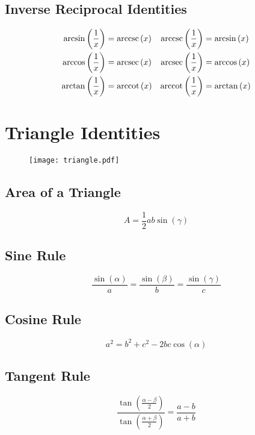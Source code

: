 \documentclass{article}
\begin{document}
\subsection{Inverse Reciprocal Identities}
\begin{align*}
    \arcsin{\left( \frac{1}{x} \right)} &= \arccsc{\left( x \right)} & \arccsc{\left( \frac{1}{x} \right)} &= \arcsin{\left( x \right)} \\
    \arccos{\left( \frac{1}{x} \right)} &= \arcsec{\left( x \right)} & \arcsec{\left( \frac{1}{x} \right)} &= \arccos{\left( x \right)} \\
    \arctan{\left( \frac{1}{x} \right)} &= \arccot{\left( x \right)} & \arccot{\left( \frac{1}{x} \right)} &= \arctan{\left( x \right)} \\
\end{align*}
\section{Triangle Identities}
\begin{figure}[H]
	\centering
	\texttt{[image: triangle.pdf]}
\end{figure}
\subsection{Area of a Triangle}
\begin{equation*}
	A=\frac{1}{2}a b \sin{\left( \gamma \right)}
\end{equation*}
\subsection{Sine Rule}
\begin{equation*}
	\frac{\sin{\left( \alpha \right)}}{a} = \frac{\sin{\left( \beta \right)}}{b} = \frac{\sin{\left( \gamma \right)}}{c}
\end{equation*}
\subsection{Cosine Rule}
\begin{equation*}
	a^2=b^2+c^2-2b c\cos{\left( \alpha \right)}
\end{equation*}
\subsection{Tangent Rule}
\begin{equation*}
	\frac{\tan{\left( \frac{\alpha-\beta}{2} \right)}}{\tan{\left( \frac{\alpha+\beta}{2} \right)}} = \frac{a-b}{a+b}
\end{equation*}
\end{document}

